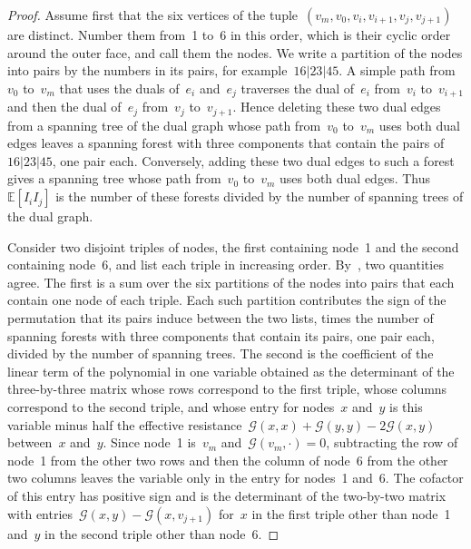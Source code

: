 \documentclass[11pt]{amsart}
\numberwithin{equation}{section}
\newcommand{\EE}{\mathbb E}
\begin{document}
\begin{proof}
Assume first that the six vertices of the tuple~$(v_m,v_0,v_i,v_{i+1},v_j,v_{j+1})$ are distinct. Number them from~1 to~6 in this order, which is their cyclic order around the outer face, and call them the nodes. We write a partition of the nodes into pairs by the numbers in its pairs, for example~$16|23|45$. A simple path from~$v_0$ to~$v_m$ that uses the duals of~$e_i$ and~$e_j$ traverses the dual of~$e_i$ from~$v_i$ to~$v_{i+1}$ and then the dual of~$e_j$ from~$v_j$ to~$v_{j+1}$. Hence deleting these two dual edges from a spanning tree of the dual graph whose path from~$v_0$ to~$v_m$ uses both dual edges leaves a spanning forest with three components that contain the pairs of~$16|23|45$, one pair each. Conversely, adding these two dual edges to such a forest gives a spanning tree whose path from~$v_0$ to~$v_m$ uses both dual edges. Thus~$\EE[I_iI_j]$ is the number of these forests divided by the number of spanning trees of the dual graph.

Consider two disjoint triples of nodes, the first containing node~1 and the second containing node~6, and list each triple in increasing order. By~\citet*[Theorems~8.1 and~B.3]{KenyonWilson2009}, two quantities agree. The first is a sum over the six partitions of the nodes into pairs that each contain one node of each triple. Each such partition contributes the sign of the permutation that its pairs induce between the two lists, times the number of spanning forests with three components that contain its pairs, one pair each, divided by the number of spanning trees. The second is the coefficient of the linear term of the polynomial in one variable obtained as the determinant of the three-by-three matrix whose rows correspond to the first triple, whose columns correspond to the second triple, and whose entry for nodes~$x$ and~$y$ is this variable minus half the effective resistance~$\mathcal G(x,x)+\mathcal G(y,y)-2\mathcal G(x,y)$ between~$x$ and~$y$. Since node~1 is~$v_m$ and~$\mathcal G(v_m,\cdot)=0$, subtracting the row of node~1 from the other two rows and then the column of node~6 from the other two columns leaves the variable only in the entry for nodes~1 and~6. The cofactor of this entry has positive sign and is the determinant of the two-by-two matrix with entries~$\mathcal G(x,y)-\mathcal G(x,v_{j+1})$ for~$x$ in the first triple other than node~1 and~$y$ in the second triple other than node~6.


\end{proof}
\end{document}
